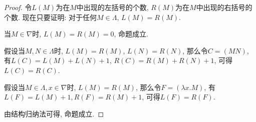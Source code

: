 \begin{proof}
    令$L(M)$为在$M$中出现的左括号的个数, $R(M)$为在$M$中出现的右括号的个数. 现在只要证明: 对于任何$M\in\Lambda$, $L(M)=R(M)$.

    当$M\in\nabla$时, $L(M)=R(M)=0$, 命题成立.

    假设当$M,N\in\Lambda$时, $L(M)=R(M)$, $L(N)=R(N)$, 那么令$C=(MN)$, 有$L(C)=L(M)+L(N)+1$, $R(C)=R(M)+R(N)+1$, 可得$L(C)=R(C)$.

    假设当$M\in\Lambda, x\in\nabla$时, $L(M)=R(M)$, 那么令$F=(\lambda x.M)$, 有$L(F)=L(M)+1, R(F)=R(M)+1$, 可得$L(F)=R(F)$.

    由结构归纳法可得, 命题成立.
\end{proof}